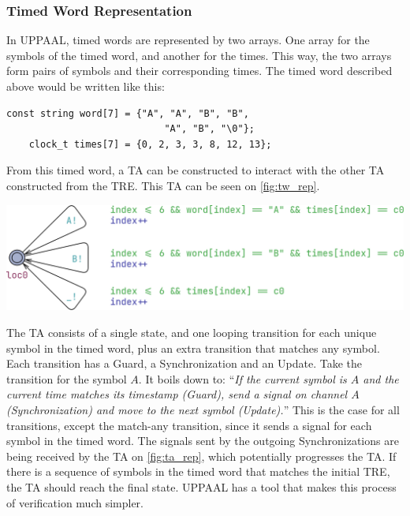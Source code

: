 \subsubsection{Timed Word Representation}\label{subsubsec:tw_rep}
In UPPAAL, timed words are represented by two arrays. One array for the symbols of the timed word, and another for the times. This way, the two arrays form pairs of symbols and their corresponding times. The timed word described above would be written like this:

\vspace{0.75em}
\begin{lstlisting}[basicstyle=\scriptsize]
    const string word[7] = {"A", "A", "B", "B", 
                            "A", "B", "\0"};
    clock_t times[7] = {0, 2, 3, 3, 8, 12, 13};
\end{lstlisting}
\label{lstlisting:timed_word}
\vspace{0.75em}

From this timed word, a TA can be constructed to interact with the other TA constructed from the TRE. This TA can be seen on \cref{fig:tw_rep}.

\vspace{0.75em}
\begin{center}
    \includegraphics[width=\columnwidth]{Documents/Diagrams/CheckingFigures/checking_twrep.png}
    \label{fig:tw_rep}
\end{center}
\vspace{0.75em}

The TA consists of a single state, and one looping transition for each unique symbol in the timed word, plus an extra transition that matches any symbol.
Each transition has a Guard, a Synchronization and an Update. Take the transition for the symbol $A$.
It boils down to: ``\textit{If the current symbol is $A$ and the current time matches its timestamp (Guard), send a signal on channel $A$(Synchronization) and move to the next symbol (Update).}''
This is the case for all transitions, except the match-any transition, since it sends a signal for each symbol in the timed word. The signals sent by the outgoing Synchronizations are being received by the TA on \cref{fig:ta_rep}, which potentially progresses the TA. If there is a sequence of symbols in the timed word that matches the initial TRE, the TA should reach the final state. UPPAAL has a tool that makes this process of verification much simpler.

